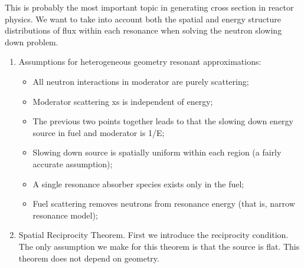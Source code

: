 \documentclass{school-22.211-notes}
\date{March  5, 2012}
\begin{document}
\maketitle


\clearpage
{} \label{heterogeneous-geo}
This is probably the most important topic in generating cross section in reactor physics. We want to take into account both the spatial and energy structure distributions of flux within each resonance when solving the neutron slowing down problem. 

\begin{enumerate}
\item Assumptions for heterogeneous geometry resonant approximations:
\begin{itemize}
\item All neutron interactions in moderator are purely scattering;
\item Moderator scattering xs is independent of energy;
\item The previous two points together leads to that the slowing down energy source in fuel and moderator is 1/E;
\item Slowing down source is spatially uniform within each region (a fairly accurate assumption);
\item A single resonance absorber species exists only in the fuel;
\item Fuel scattering removes neutrons from resonance energy (that is, narrow resonance model); 
\end{itemize}

\item Spatial Reciprocity Theorem. First we introduce the reciprocity condition. The only assumption we make for this theorem is that the source is flat. This theorem does not depend on geometry. 


\end{enumerate}
\end{document}

